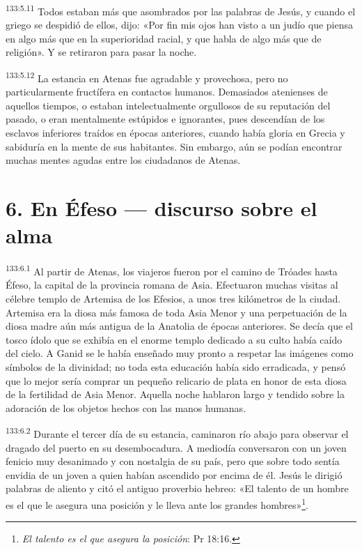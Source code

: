 \par
\textsuperscript{133:5.11} Todos estaban más que asombrados por las palabras de Jesús, y cuando el griego se despidió de ellos, dijo: «Por fin mis ojos han visto a un judío que piensa en algo más que en la superioridad racial, y que habla de algo más que de religión». Y se retiraron para pasar la noche.

\par
\textsuperscript{133:5.12} La estancia en Atenas fue agradable y provechosa, pero no particularmente fructífera en contactos humanos. Demasiados atenienses de aquellos tiempos, o estaban intelectualmente orgullosos de su reputación del pasado, o eran mentalmente estúpidos e ignorantes, pues descendían de los esclavos inferiores traídos en épocas anteriores, cuando había gloria en Grecia y sabiduría en la mente de sus habitantes. Sin embargo, aún se podían encontrar muchas mentes agudas entre los ciudadanos de Atenas.

\section*{6. En Éfeso --- discurso sobre el alma}
\par
\textsuperscript{133:6.1} Al partir de Atenas, los viajeros fueron por el camino de Tróades hasta Éfeso, la capital de la provincia romana de Asia. Efectuaron muchas visitas al célebre templo de Artemisa de los Efesios, a unos tres kilómetros de la ciudad. Artemisa era la diosa más famosa de toda Asia Menor y una perpetuación de la diosa madre aún más antigua de la Anatolia de épocas anteriores. Se decía que el tosco ídolo que se exhibía en el enorme templo dedicado a su culto había caído del cielo. A Ganid se le había enseñado muy pronto a respetar las imágenes como símbolos de la divinidad; no toda esta educación había sido erradicada, y pensó que lo mejor sería comprar un pequeño relicario de plata en honor de esta diosa de la fertilidad de Asia Menor. Aquella noche hablaron largo y tendido sobre la adoración de los objetos hechos con las manos humanas.

\par
\textsuperscript{133:6.2} Durante el tercer día de su estancia, caminaron río abajo para observar el dragado del puerto en su desembocadura. A mediodía conversaron con un joven fenicio muy desanimado y con nostalgia de su país, pero que sobre todo sentía envidia de un joven a quien habían ascendido por encima de él. Jesús le dirigió palabras de aliento y citó el antiguo proverbio hebreo: «El talento de un hombre es el que le asegura una posición y le lleva ante los grandes hombres»\footnote{\textit{El talento es el que asegura la posición}: Pr 18:16.}.

